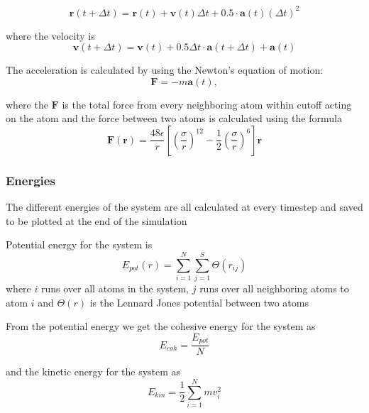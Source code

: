 \documentclass[12pt,a4paper]{article}
\begin{document}
\begin{equation}
\label{eq:newPos}
\mathbf r(t+\Delta t) =\mathbf r(t) + \mathbf v(t)\Delta t + 0.5 \cdot \mathbf a(t) (\Delta t)^2
\end{equation}

where the velocity is 
\begin{equation}
\label{eq:velVerlet}
\mathbf v(t+\Delta t) = \mathbf v(t) + 0.5\Delta t  \cdot \mathbf a(t+\Delta t) + \mathbf a(t)
\end{equation}

The acceleration is calculated by using the Newton's equation of motion:
\begin{equation}
\label{eq:acceleration}
\mathbf F = -m\mathbf a(t),
\end{equation}

where the \(\mathbf F\) is the total force from every neighboring atom within cutoff acting on the atom and the force between two atoms is calculated using the formula
\begin{equation}
\label{eq:force}
\mathbf F(\mathbf r)=\frac{48\epsilon}{r} \left[\left(\frac{\sigma}{r}\right)^{12} - \frac 1 2 \left(\frac{\sigma}{r}\right)^6\right] \mathbf r
\end{equation}

\subsubsection{Energies}
The different energies of the system are all calculated at every timestep and saved to be plotted at the end of the simulation

Potential energy for the system is 
\begin{equation}
E_{pot}(r)=\sum_{i=1}^N \sum_{j=1}^S \Theta(r_{ij})
\end{equation}
where \(i\) runs over all atoms in the system, \(j\) runs over all neighboring atoms to atom \(i\) and \( \Theta(r)\) is the Lennard Jones potential between two atoms 

From the potential energy we get the cohesive energy for the system as
\begin{equation}
\label{eq:Ecoh}
E_{coh}=\frac{E_{pot}} N
\end{equation}

and the kinetic energy for the system as
\begin{equation}
\label{eq:Ekin}
E_{kin}=\frac{1}2 \sum_{i=1}^N mv_i^2
\end{equation}
\end{document}
